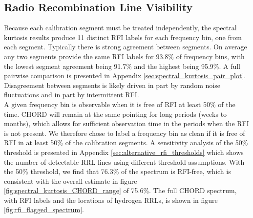 \subsection{Radio Recombination Line Visibility}
Because each calibration segment must be treated independently, the spectral kurtosis results produce 11 distinct RFI labels for each frequency bin, one from each segment. Typically there is strong agreement between segments. On average any two segments provide the same RFI labels for 93.8\% of frequency bins, with the lowest segment agreement being 91.7\% and the highest being 95.9\%. A full pairwise comparison is presented in Appendix \ref{sec:spectral_kurtosis_pair_plot}. Disagreement between segments is likely driven in part by random noise fluctuations and in part by intermittent RFI. \\

A given frequency bin is observable when it is free of RFI at least 50\% of the time. CHORD will remain at the same pointing for long periods (weeks to months), which allows for sufficient observation time in the periods when the RFI is not present. We therefore chose to label a frequency bin as clean if it is free of RFI in at least 50\% of the calibration segments. A sensitivity analysis of the 50\% threshold is presented in Appendix \ref{sec:alternative_rfi_thresholds} which shows the number of detectable RRL lines using different threshold assumptions. With the 50\% threshold, we find that 76.3\% of the spectrum is RFI-free, which is consistent with the overall estimate in figure \ref{fig:spectral_kurtosis_CHORD_range} of 75.6\%. The full CHORD spectrum, with RFI labels and the locations of hydrogen RRLs, is shown in figure \ref{fig:rfi_flagged_spectrum}. \\

